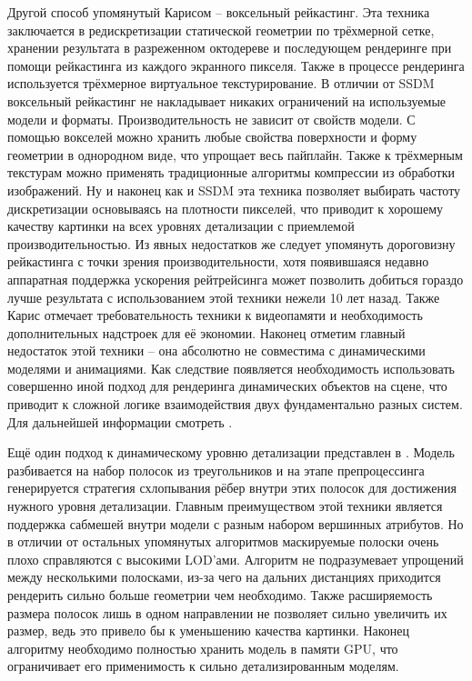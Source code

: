 \documentclass{article}
\begin{document}
Другой способ упомянутый Карисом -- воксельный рейкастинг. Эта техника заключается в редискретизации статической геометрии по трёхмерной сетке, хранении результата в разреженном октодереве и последующем рендеринге при помощи рейкастинга из каждого экранного пикселя. Также в процессе рендеринга используется трёхмерное виртуальное текстурирование. В отличии от SSDM воксельный рейкастинг не накладывает никаких ограничений на используемые модели и форматы. Производительность не зависит от свойств модели. С помощью вокселей можно хранить любые свойства поверхности и форму геометрии в однородном виде, что упрощает весь пайплайн. Также к трёхмерным текстурам можно применять традиционные алгоритмы компрессии из обработки изображений. Ну и наконец как и SSDM эта техника позволяет выбирать частоту дискретизации основываясь на плотности пикселей, что приводит к хорошему качеству картинки на всех уровнях детализации с приемлемой производительностью. Из явных недостатков же следует упомянуть дороговизну рейкастинга с точки зрения производительности, хотя появившаяся недавно аппаратная поддержка ускорения рейтрейсинга может позволить добиться гораздо лучше результата с использованием этой техники нежели 10 лет назад. Также Карис отмечает требовательность техники к видеопамяти и необходимость дополнительных надстроек для её экономии. Наконец отметим главный недостаток этой техники -- она абсолютно не совместима с динамическими моделями и анимациями. Как следствие появляется необходимость использовать совершенно иной подход для рендеринга динамических объектов на сцене, что приводит к сложной логике взаимодействия двух фундаментально разных систем. Для дальнейшей информации смотреть \cite{cur_and_next_parallelism}.

Ещё один подход к динамическому уровню детализации представлен в \cite{RIPOLLES2009184}. Модель разбивается на набор полосок из треугольников и на этапе препроцессинга генерируется стратегия схлопывания рёбер внутри этих полосок для достижения нужного уровня детализации. Главным преимуществом этой техники является поддержка сабмешей внутри модели с разным набором вершинных атрибутов. Но в отличии от остальных упомянутых алгоритмов маскируемые полоски очень плохо справляются с высокими LOD'ами. Алгоритм не подразумевает упрощений между несколькими полосками, из-за чего на дальних дистанциях приходится рендерить сильно больше геометрии чем необходимо. Также расширяемость размера полосок лишь в одном направлении не позволяет сильно увеличить их размер, ведь это привело бы к уменьшению качества картинки. Наконец алгоритму необходимо полностью хранить модель в памяти GPU, что ограничивает его применимость к сильно детализированным моделям.
\end{document}
